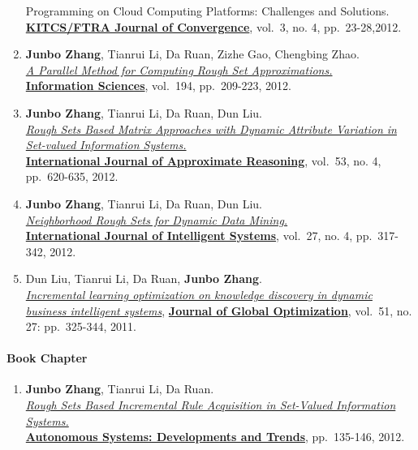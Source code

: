 \documentclass[]{article}
\begin{document}
\begin{enumerate}
{{  Programming on Cloud Computing Platforms: Challenges and
  Solutions.}}\\ \href{http://www.ftrai.org/joc/}{\textbf{KITCS/FTRA
  Journal of Convergence}}, vol.~3, no. 4, pp.~23-28,2012.
\item
  \textbf{Junbo Zhang}, Tianrui Li, Da Ruan, Zizhe Gao, Chengbing
  Zhao.\\ \href{http://dx.doi.org/10.1016/j.ins.2011.12.036}{\emph{A
  Parallel Method for Computing Rough Set Approximations.}}\\
  \href{http://www.journals.elsevier.com/information-sciences}{\textbf{Information
  Sciences}}, vol.~194, pp.~209-223, 2012.
\item
  \textbf{Junbo Zhang}, Tianrui Li, Da Ruan, Dun Liu.\\
  \href{http://dx.doi.org/10.1016/j.ijar.2012.01.001}{\emph{Rough Sets
  Based Matrix Approaches with Dynamic Attribute Variation in Set-valued
  Information Systems.}}\\
  \href{http://www.journals.elsevier.com/international-journal-of-approximate-reasoning}{\textbf{International
  Journal of Approximate Reasoning}}, vol.~53, no. 4, pp.~620-635, 2012.
\item
  \textbf{Junbo Zhang}, Tianrui Li, Da Ruan, Dun Liu.\\
  \href{http://dx.doi.org/10.1002/int.21523}{\emph{Neighborhood Rough
  Sets for Dynamic Data Mining.}}\\
  \href{http://onlinelibrary.wiley.com/journal/10.1002/{[}ISSN{]}1098-111X}{\textbf{International
  Journal of Intelligent Systems}}, vol.~27, no. 4, pp.~317-342, 2012.
\item
  Dun Liu, Tianrui Li, Da Ruan, \textbf{Junbo Zhang}.\\
  \href{http://dx.doi.org/10.1007/s10898-010-9607-8}{\emph{Incremental
  learning optimization on knowledge discovery in dynamic business
  intelligent systems}},
  \href{http://www.springer.com/business+\%26+management/operations+research/journal/10898}{\textbf{Journal
  of Global Optimization}}, vol.~51, no. 27: pp.~325-344, 2011.
\end{enumerate}

\paragraph{Book Chapter}\label{book-chapter}

\begin{enumerate}
\def\labelenumi{\arabic{enumi}.}
\itemsep1pt\parskip0pt
\item
  \textbf{Junbo Zhang}, Tianrui Li, Da Ruan.\\
  \href{http://dx.doi.org/10.1007/978-3-642-24806-1_11}{\emph{Rough Sets
  Based Incremental Rule Acquisition in Set-Valued Information
  Systems.}}\\
  \href{http://www.springer.com/engineering/computational+intelligence+and+complexity/book/978-3-642-24805-4}{\textbf{Autonomous
  Systems: Developments and Trends}}, pp.~135-146, 2012.
\end{enumerate}
\end{document}
